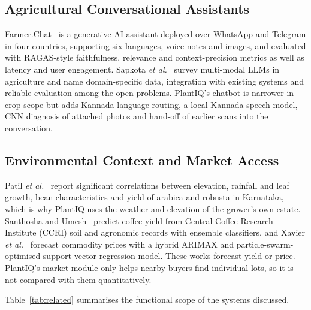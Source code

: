 \subsection{Agricultural Conversational Assistants}
Farmer.Chat~\cite{singh2024farmerchat} is a generative-AI assistant deployed over WhatsApp and Telegram in four
countries, supporting six languages, voice notes and images, and evaluated with RAGAS-style
faithfulness, relevance and context-precision metrics as well as latency and user engagement. Sapkota
\textit{et al.}~\cite{sapkota2024mmllm} survey multi-modal LLMs in agriculture and name domain-specific data,
integration with existing systems and reliable evaluation among the open problems. PlantIQ's chatbot is narrower in crop scope
but adds Kannada language routing, a local Kannada speech model, CNN diagnosis of attached photos and hand-off of
earlier scans into the conversation.

\subsection{Environmental Context and Market Access}
Patil \textit{et al.}~\cite{patil2022elevation} report significant correlations between elevation, rainfall and
leaf growth, bean characteristics and yield of arabica and robusta in Karnataka, which is why PlantIQ uses the weather and
elevation of the grower's own estate. Santhosha and Umesh~\cite{santhosha2023yield} predict coffee yield from Central Coffee
Research Institute (CCRI) soil and agronomic records with ensemble classifiers, and Xavier
\textit{et al.}~\cite{xavier2023price} forecast commodity prices with a hybrid ARIMAX and particle-swarm-optimised
support vector regression model. These works forecast yield or price. PlantIQ's market module only helps nearby buyers find individual lots, so it is
not compared with them quantitatively.

Table~\ref{tab:related} summarises the functional scope of the systems discussed.

